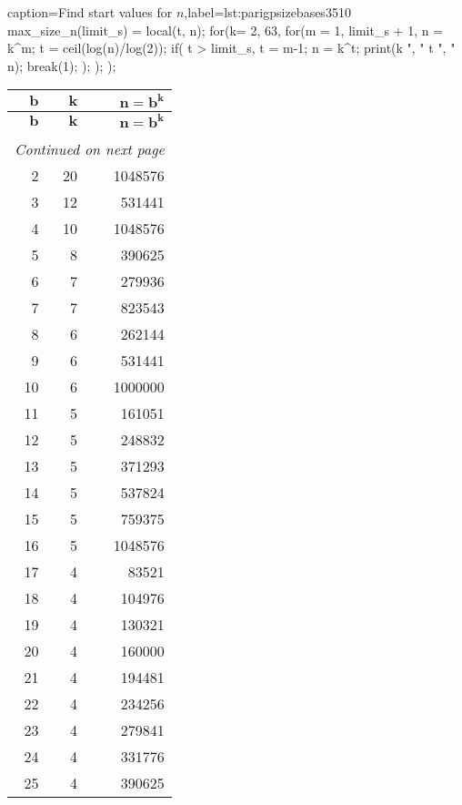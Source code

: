 \documentclass[a4paper,10pt]{article}
\theoremstyle{plain} %
\theoremstyle{definition}
\theoremstyle{remark}
\begin{document}
\lstset{language=parigp}
\begin{pblisting}{caption={Find start values for $n$},label=lst:parigpsizebases3510}
max_size_n(limit_s) = {
   local(t, n);
   for(k= 2, 63,
      for(m = 1, limit_s + 1,
         n = k^m;
         t = ceil(log(n)/log(2));
         if( t > limit_s,
            t = m-1;
            n = k^t;
            print(k ", " t ", " n);
            break(1);
         );
      );
   );
}

\end{pblisting}
\begin{center}
\begin{longtable}{r r r}
\multicolumn{1}{r}{$\mathbf{b}$}&
\multicolumn{1}{r}{$\mathbf{k}$}&
\multicolumn{1}{r}{$\mathbf{n = b^k}$} \\
\endfirsthead
%
\multicolumn{1}{r}{$\mathbf{b}$}&
\multicolumn{1}{r}{$\mathbf{k}$}&
\multicolumn{1}{r}{$\mathbf{n = b^k}$} \\
\endhead
\rule{0pt}{1ex}\\
\multicolumn{3}{c}{{\footnotesize{\textit{Continued on next page}}}} \\
\endfoot
\endlastfoot
2 & 20 & 1048576\\
3 & 12 & 531441\\
4 & 10 & 1048576\\
5 & 8 & 390625\\
6 & 7 & 279936\\
7 & 7 & 823543\\
8 & 6 & 262144\\
9 & 6 & 531441\\
10 & 6 & 1000000\\
11 & 5 & 161051\\
12 & 5 & 248832\\
13 & 5 & 371293\\
14 & 5 & 537824\\
15 & 5 & 759375\\
16 & 5 & 1048576\\
17 & 4 & 83521\\
18 & 4 & 104976\\
19 & 4 & 130321\\
20 & 4 & 160000\\
21 & 4 & 194481\\
22 & 4 & 234256\\
23 & 4 & 279841\\
24 & 4 & 331776\\
25 & 4 & 390625\\

\end{longtable}
\end{center}
\end{document}
